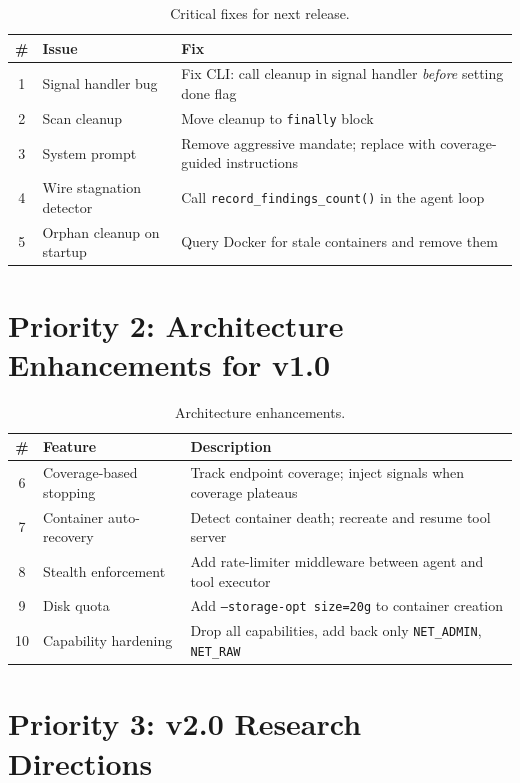 \documentclass[12pt,a4paper]{report}
\begin{document}
\begin{table}[H]
\centering
\caption{Critical fixes for next release.}
\begin{tabularx}{\textwidth}{clX}
\toprule
\textbf{\#} & \textbf{Issue} & \textbf{Fix} \\
\midrule
1 & Signal handler bug & Fix CLI: call cleanup in signal handler \emph{before} setting done flag \\
2 & Scan cleanup & Move cleanup to \texttt{finally} block \\
3 & System prompt & Remove aggressive mandate; replace with coverage-guided instructions \\
4 & Wire stagnation detector & Call \texttt{record\_findings\_count()} in the agent loop \\
5 & Orphan cleanup on startup & Query Docker for stale containers and remove them \\
\bottomrule
\end{tabularx}
\end{table}

\section{Priority 2: Architecture Enhancements for v1.0}

\begin{table}[H]
\centering
\caption{Architecture enhancements.}
\begin{tabularx}{\textwidth}{clX}
\toprule
\textbf{\#} & \textbf{Feature} & \textbf{Description} \\
\midrule
6 & Coverage-based stopping & Track endpoint coverage; inject signals when coverage plateaus \\
7 & Container auto-recovery & Detect container death; recreate and resume tool server \\
8 & Stealth enforcement & Add rate-limiter middleware between agent and tool executor \\
9 & Disk quota & Add \texttt{--storage-opt size=20g} to container creation \\
10 & Capability hardening & Drop all capabilities, add back only \texttt{NET\_ADMIN}, \texttt{NET\_RAW} \\
\bottomrule
\end{tabularx}
\end{table}

\section{Priority 3: v2.0 Research Directions}
\end{document}
